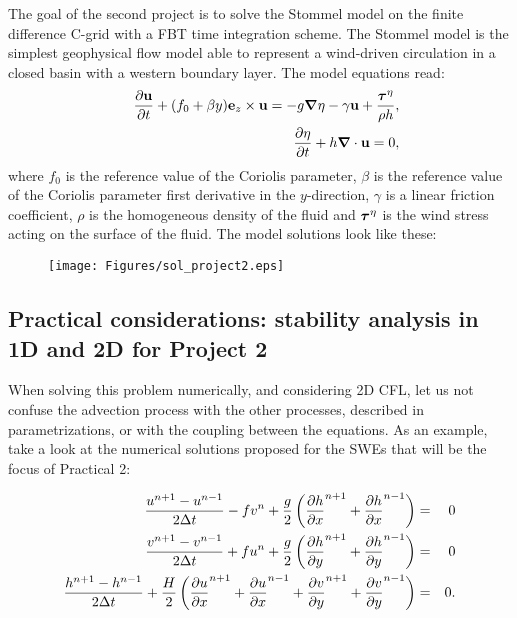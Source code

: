 The goal of the second project is to solve the Stommel model on the finite difference C-grid with a FBT time integration scheme. The Stommel model is the simplest geophysical flow model able to represent a wind-driven circulation in a closed basin with a western boundary layer. The model equations read:
\begin{eqnarray}
	&&\frac{\partial \mathbf{u}}{\partial t} + (f_0+\beta y) \mathbf{e}_z \times
	\mathbf{u} = -g \mbox{\boldmath $\nabla$} \eta - \gamma \mathbf{u} + \frac{\mbox{\boldmath $\tau$}^{\eta}}{\rho h},\\
	&&\frac{\partial \eta}{\partial t} + h \mbox{\boldmath $\nabla$} \cdot \mathbf{u} = 0,
\end{eqnarray}
where $f_0$ is the reference value of the Coriolis parameter, $\beta$ is the reference value of the Coriolis parameter first derivative in the $y$-direction, $\gamma$ is a linear friction coefficient, $\rho$ is the homogeneous density of the fluid and $\mbox{\boldmath $\tau$}^{\eta}$ is the wind stress acting on the surface of the fluid. The model solutions look like these:

\begin{figure}[h!]
	\begin{center}
		\texttt{[image: Figures/sol\_project2.eps]}
	\end{center}
\end{figure}


\subsection{Practical considerations: stability analysis in 1D and 2D for Project 2}

When solving this problem numerically, and considering 2D CFL, let us not confuse the advection process with the other processes, described in parametrizations, or with the coupling between the equations. 
As an example, take a look at the numerical solutions proposed for the SWEs that will be the focus of Practical 2:

\begin{eqnarray*}
	\frac{u^{n+1}-u^{n-1}}{2\Delta t}-fv^n+\frac{g}{2}
	\left( \frac{\partial h}{\partial x}^{n+1} +\frac{\partial h}{\partial x}^{n-1} \right) & = & 0 \\
	\frac{v^{n+1}-v^{n-1}}{2\Delta t}+fu^n+\frac{g}{2}
	\left( \frac{\partial h}{\partial y}^{n+1} +\frac{\partial h}{\partial y}^{n-1} \right) & = & 0 \\
	\frac{h^{n+1}-h^{n-1}}{2\Delta t}+\frac{H}{2}
	\left( \frac{\partial u}{\partial x}^{n+1} +\frac{\partial u}{\partial x}^{n-1}
	+\frac{\partial v}{\partial y}^{n+1} +\frac{\partial v}{\partial y}^{n-1} 
	\right) & = & 0. 
\end{eqnarray*}


